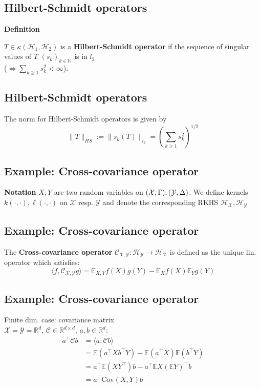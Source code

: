 \clearpage

\subsection*{Hilbert-Schmidt operators}
\textbf{Definition}

$T\in\kappa(\mathcal{H}_1,\mathcal{H}_2)$ is a \textbf{Hilbert-Schmidt operator} if the sequence of singular values of $T$ $(s_k)_{k\in\mathbb{N}}$ is in $l_2$\\ ($\Leftrightarrow\sum_{k\geq1}s_k^2<\infty$).

\clearpage

\subsection*{Hilbert-Schmidt operators}
The norm for Hilbert-Schmidt operators is given by
\begin{equation*}
\|T\|_{HS}:=\|s_k(T)\|_{l_2}=(\sum_{k\geq1}s^2_k)^{1/2}
\end{equation*}

\clearpage

\subsection*{Example: Cross-covariance operator}
\textbf{Notation}
$X,Y$ are two random variables on $(\mathcal{X},\Gamma),\\(\mathcal{Y},\Delta)$. We define kernels $k(\cdot,\cdot),\ell(\cdot,\cdot)$ on $\mathcal{X}$ resp. $\mathcal{Y}$ and denote the corresponding RKHS $\mathcal{H}_{\mathcal{X}},\mathcal{H}_{\mathcal{Y}}$

\clearpage

\subsection*{Example: Cross-covariance operator}
The \textbf{Cross-covariance operator} $\mathcal{C}_{\mathcal{X},\mathcal{Y}}: \mathcal{H}_{\mathcal{Y}}\rightarrow\mathcal{H}_{\mathcal{X}}$ is defined as the unique lin. operator which satisfies:
\begin{equation*}
\langle f,\mathcal{C}_{\mathcal{X},\mathcal{Y}}g\rangle=\mathbb{E}_{X,Y}f(X)g(Y)-\mathbb{E}_{X}f(X)\mathbb{E}_{Y}g(Y)
\end{equation*}

\clearpage
\subsection*{Example: Cross-covariance operator}
Finite dim. case: covariance matrix \\$\mathcal{X}=\mathcal{Y}=\mathbb{R}^d$, $\mathcal{C}\in\mathbb{R}^{d\times d}$, $a,b\in\mathbb{R}^d$:
\begin{align*}
a^\top\mathcal C b&=\langle a,\mathcal{C}b\rangle\\&=\mathbb{E}(a^\top X b^\top Y)-\mathbb{E}(a^\top X)\mathbb{E}(b^\top Y)\\&=a^\top\mathbb{E}(XY^\top)b-a^\top\mathbb{E}X(\mathbb{E}Y)^\top b\\&=a^\top \text{Cov}(X,Y)b
\end{align*}


